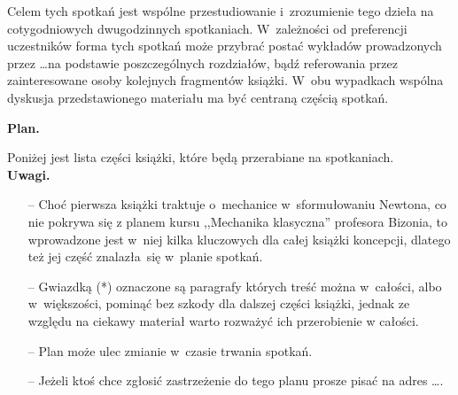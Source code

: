 \documentclass[a4paper,11pt]{article}
\begin{document}
Celem tych spotkań jest wspólne przestudiowanie i~zrozumienie tego
dzieła na cotygodniowych dwugodzinnych spotkaniach. W~zależności od
preferencji uczestników forma tych spotkań może przybrać postać
wykładów prowadzonych przez \ldots na podstawie poszczególnych
rozdziałów, bądź referowania przez zainteresowane osoby kolejnych
fragmentów książki. W~obu wypadkach wspólna dyskusja przedstawionego
materiału ma być centraną częścią spotkań.

\begin{center}
  \Large{\textbf{Plan.}} \\
\end{center}
\noindent
Poniżej jest lista części książki, które będą przerabiane na
spotkaniach. \\ \newline
\noindent
\textbf{Uwagi.}
\begin{itemize}
\item[--] Choć pierwsza książki traktuje o~mechanice w~sformułowaniu
  Newtona, co nie pokrywa się z planem kursu ,,Mechanika klasyczna''
  profesora Bizonia, to wprowadzone jest w~niej kilka kluczowych dla
  całej książki koncepcji, dlatego też jej część znalazła~się w~planie
  spotkań.
\item[--] Gwiazdką (*) oznaczone są paragrafy których treść można
  w~całości, albo w~większości, pominąć bez szkody dla dalszej części
  książki, jednak ze względu na ciekawy materiał warto rozważyć ich
  przerobienie w całości.
\item[--] Plan może ulec zmianie w~czasie trwania spotkań.
\item[--] Jeżeli ktoś chce zgłosić zastrzeżenie do tego planu prosze
  pisać na adres \ldots .
\end{itemize}
\end{document}
